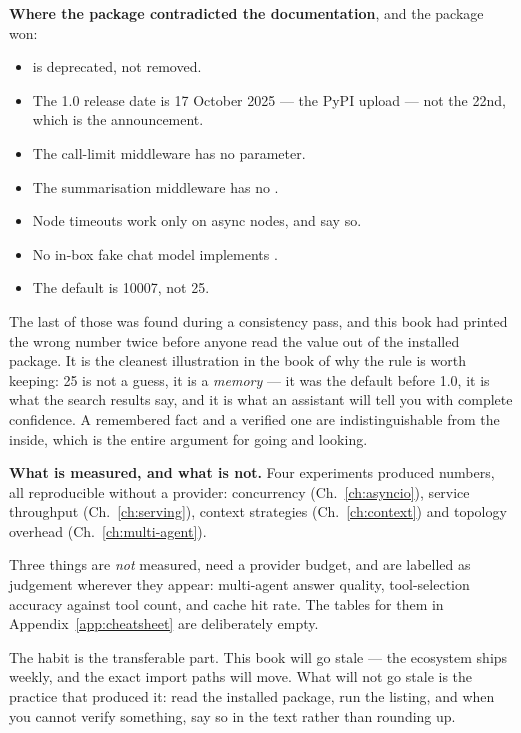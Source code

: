 \textbf{Where the package contradicted the documentation}, and the package won:

\begin{itemize}[leftmargin=1.4em,nosep]
\item {} is deprecated, not removed.
\item The 1.0 release date is 17 October 2025 --- the PyPI upload --- not the
      22nd, which is the announcement.
\item The call-limit middleware has no  parameter.
\item The summarisation middleware has no .
\item Node timeouts work only on async nodes, and say so.
\item No in-box fake chat model implements .
\item The default  is 10007, not 25.
\end{itemize}

The last of those was found during a consistency pass, and this book had printed
the wrong number twice before anyone read the value out of the installed
package. It is the cleanest illustration in the book
of why the rule is worth keeping: 25 is not a guess, it is a \emph{memory} --- it
was the default before 1.0, it is what the search results say, and it is what an
assistant will tell you with complete confidence. A remembered fact and a
verified one are indistinguishable from the inside, which is the entire argument
for going and looking.

\textbf{What is measured, and what is not.} Four experiments produced numbers,
all reproducible without a provider: concurrency (Ch.~\ref{ch:asyncio}), service
throughput (Ch.~\ref{ch:serving}), context strategies (Ch.~\ref{ch:context}) and
topology overhead (Ch.~\ref{ch:multi-agent}).

Three things are \emph{not} measured, need a provider budget, and are labelled as
judgement wherever they appear: multi-agent answer quality, tool-selection
accuracy against tool count, and cache hit rate. The tables for them in
Appendix~\ref{app:cheatsheet} are deliberately empty.

\begin{note}
The habit is the transferable part. This book will go stale --- the ecosystem
ships weekly, and the exact import paths will move. What will not go stale is the
practice that produced it: read the installed package, run the listing, and when
you cannot verify something, say so in the text rather than rounding up.
\end{note}
